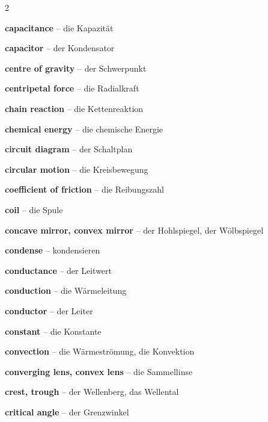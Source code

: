 \begin{multicols}{2}
\par\nopagebreak
\textbf{capacitance} -- die Kapazität\dotfill\hyperref[e:170]{\pageref*{e:170}}\par
\textbf{capacitor} -- der Kondensator\dotfill\hyperref[e:169]{\pageref*{e:169}}\par
\textbf{centre of gravity} -- der Schwerpunkt\dotfill\hyperref[e:88]{\pageref*{e:88}}\par
\textbf{centripetal force} -- die Radialkraft\dotfill\hyperref[e:94]{\pageref*{e:94}}\par
\textbf{chain reaction} -- die Kettenreaktion\dotfill\hyperref[e:287]{\pageref*{e:287}}\par
\textbf{chemical energy} -- die chemische Energie\dotfill\hyperref[e:102]{\pageref*{e:102}}\par
\textbf{circuit diagram} -- der Schaltplan\dotfill\hyperref[e:154]{\pageref*{e:154}}\par
\textbf{circular motion} -- die Kreisbewegung\dotfill\hyperref[e:50]{\pageref*{e:50}}\par
\textbf{coefficient of friction} -- die Reibungszahl\dotfill\hyperref[e:66]{\pageref*{e:66}}\par
\textbf{coil} -- die Spule\dotfill\hyperref[e:181]{\pageref*{e:181}}\par
\textbf{concave mirror, convex mirror} -- der Hohlspiegel, der Wölbspiegel\dotfill\hyperref[e:233]{\pageref*{e:233}}\par
\textbf{condense} -- kondensieren\dotfill\hyperref[e:133]{\pageref*{e:133}}\par
\textbf{conductance} -- der Leitwert\dotfill\hyperref[e:149]{\pageref*{e:149}}\par
\textbf{conduction} -- die Wärmeleitung\dotfill\hyperref[e:120]{\pageref*{e:120}}\par
\textbf{conductor} -- der Leiter\dotfill\hyperref[e:150]{\pageref*{e:150}}\par
\textbf{constant} -- die Konstante\dotfill\hyperref[e:27]{\pageref*{e:27}}\par
\textbf{convection} -- die Wärmeströmung, die Konvektion\dotfill\hyperref[e:121]{\pageref*{e:121}}\par
\textbf{converging lens, convex lens} -- die Sammellinse\dotfill\hyperref[e:241]{\pageref*{e:241}}\par
\textbf{crest, trough} -- der Wellenberg, das Wellental\dotfill\hyperref[e:204]{\pageref*{e:204}}\par
\textbf{critical angle} -- der Grenzwinkel\dotfill\hyperref[e:239]{\pageref*{e:239}}\par


\end{multicols}
